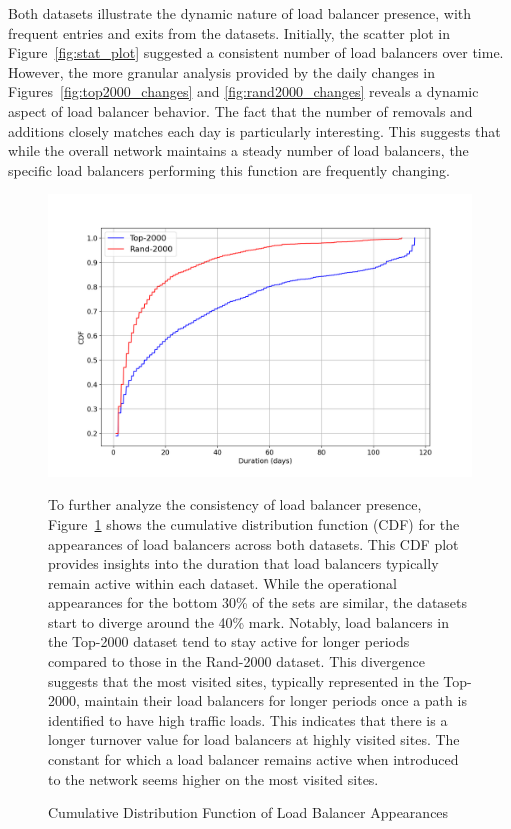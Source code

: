 \documentclass[12pt]{cwru_thesis}
\begin{document}
Both datasets illustrate the dynamic nature of load balancer presence, with frequent entries and exits from the datasets. Initially, the scatter plot in Figure~\ref{fig:stat_plot} suggested a consistent number of load balancers over time. However, the more granular analysis provided by the daily changes in Figures~\ref{fig:top2000_changes} and \ref{fig:rand2000_changes} reveals a dynamic aspect of load balancer behavior. The fact that the number of removals and additions closely matches each day is particularly interesting. This suggests that while the overall network maintains a steady number of load balancers, the specific load balancers performing this function are frequently changing.\\




\begin{figure}[h!]
    \centering
    \includegraphics[width=\linewidth]{figures/cdf_load_balancer_durations_comparison.png}
    \caption{Cumulative Distribution Function of Load Balancer Appearances}
    \label{fig:cdf_durations}
\endfigure

To further analyze the consistency of load balancer presence, Figure~\ref{fig:cdf_durations} shows the cumulative distribution function (CDF) for the appearances of load balancers across both datasets. This CDF plot provides insights into the duration that load balancers typically remain active within each dataset. While the operational appearances for the bottom 30\% of the sets are similar, the datasets start to diverge around the 40\% mark. Notably, load balancers in the Top-2000 dataset tend to stay active for longer periods compared to those in the Rand-2000 dataset. This divergence suggests that the most visited sites, typically represented in the Top-2000, maintain their load balancers for longer periods once a path is identified to have high traffic loads. This indicates that there is a longer turnover value for load balancers at highly visited sites. The constant for which a load balancer remains active when introduced to the network seems higher on the most visited sites.


\end{figure}
\end{document}
